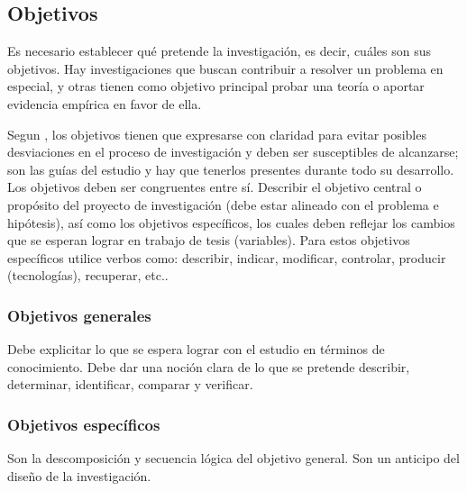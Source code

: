 \documentclass[a4paper, 12pt]{article}
\begin{document}
\subsection{Objetivos}
Es necesario establecer qué pretende la investigación, es decir, cuáles son sus objetivos. Hay investigaciones que buscan contribuir a resolver un problema en especial, y otras tienen como objetivo principal probar una teoría o aportar evidencia empírica en favor de ella. \par 
\vskip 0.3cm
Segun \cite{Rojas}, los objetivos tienen que expresarse con claridad para evitar posibles desviaciones en el proceso de investigación y deben ser susceptibles de alcanzarse; son las guías del estudio y hay que tenerlos presentes durante todo su desarrollo. Los objetivos deben ser congruentes entre sí.
\vskip 0.3cm
Describir el objetivo central o propósito del proyecto de investigación (debe estar alineado con el problema e hipótesis), así como los objetivos específicos, los cuales deben reflejar los cambios que se esperan lograr en trabajo de tesis (variables). Para estos objetivos específicos utilice verbos como: describir, indicar, modificar, controlar, producir (tecnologías), recuperar, etc..

\subsubsection{Objetivos generales}
Debe explicitar lo que se espera lograr con el estudio en términos de conocimiento. Debe dar una noción clara de lo que se pretende describir, determinar, identificar, comparar y verificar.


\subsubsection{Objetivos específicos}
Son la descomposición y secuencia lógica del objetivo general. Son un anticipo del diseño de la investigación.
\vskip 0.3cm
\end{document}
